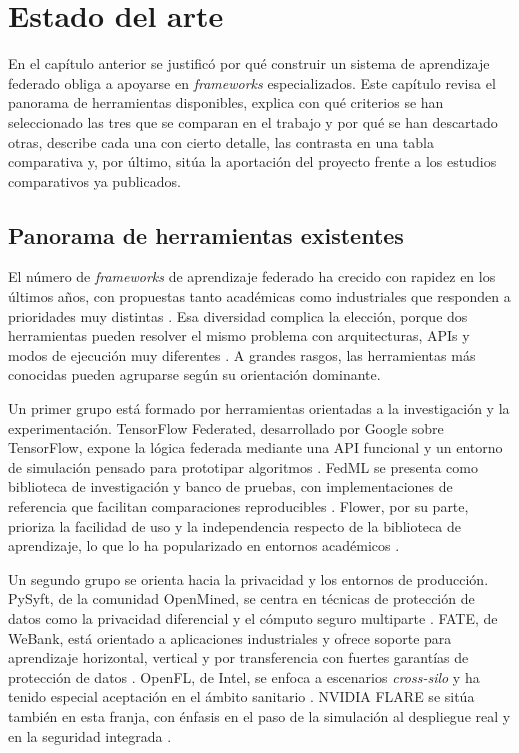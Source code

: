 \chapter{Estado del arte}\label{chap:estado-arte}

\providecommand{\FloatBarrier}{\clearpage}

En el capítulo anterior se justificó por qué construir un sistema de aprendizaje
federado obliga a apoyarse en \textit{frameworks} especializados. Este capítulo revisa el
panorama de herramientas disponibles, explica con qué criterios se han seleccionado las
tres que se comparan en el trabajo y por qué se han descartado otras, describe cada una
con cierto detalle, las contrasta en una tabla comparativa y, por último, sitúa la
aportación del proyecto frente a los estudios comparativos ya publicados.

\section{Panorama de herramientas existentes}\label{sec:panorama-frameworks}

El número de \textit{frameworks} de aprendizaje federado ha crecido con rapidez en los
últimos años, con propuestas tanto académicas como industriales que responden a
prioridades muy distintas \parencite{riedel2024comparative}. Esa diversidad complica la
elección, porque dos herramientas pueden resolver el mismo problema con arquitecturas,
APIs y modos de ejecución muy diferentes \parencite{bonawitz2019towards}. A grandes
rasgos, las herramientas más conocidas pueden agruparse según su orientación dominante.

Un primer grupo está formado por herramientas orientadas a la investigación y la
experimentación. TensorFlow Federated, desarrollado por Google sobre TensorFlow, expone
la lógica federada mediante una API funcional y un entorno de simulación pensado para
prototipar algoritmos \parencite{tff2019}. FedML se presenta como biblioteca de
investigación y banco de pruebas, con implementaciones de referencia que facilitan
comparaciones reproducibles \parencite{he2020fedml}. Flower, por su parte, prioriza la
facilidad de uso y la independencia respecto de la biblioteca de aprendizaje, lo que lo
ha popularizado en entornos académicos \parencite{beutel2020flower}.

Un segundo grupo se orienta hacia la privacidad y los entornos de producción. PySyft, de
la comunidad OpenMined, se centra en técnicas de protección de datos como la privacidad
diferencial y el cómputo seguro multiparte \parencite{ryffel2018generic}. FATE, de
WeBank, está orientado a aplicaciones industriales y ofrece soporte para aprendizaje
horizontal, vertical y por transferencia con fuertes garantías de protección de datos
\parencite{liu2021fate}. OpenFL, de Intel, se enfoca a escenarios \textit{cross-silo} y
ha tenido especial aceptación en el ámbito sanitario \parencite{reina2021openfl}. NVIDIA
FLARE se sitúa también en esta franja, con énfasis en el paso de la simulación al
despliegue real y en la seguridad integrada \parencite{roth2022nvflare}.


